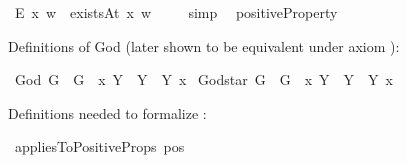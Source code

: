 \begin{isabellebody}
\ {\isachardoublequoteopen}E{\isacharbang}\ x\ w\ {\isasymlongleftrightarrow}\ existsAt\ x\ w{\isachardoublequoteclose}\ \isanewline
%
\isadelimproof
\ \ %
\endisadelimproof
%
\isatagproof
{}\isamarkupfalse%
\ simp\ %
%
\endisatagproof
{\isafoldproof}%
%
\isadelimproof
\isanewline
%
\endisadelimproof
\isanewline
{}\isamarkupfalse%
\ positiveProperty{\isacharcolon}{\isacharcolon}{\isachardoublequoteopen}{\isasymup}{\isasymlangle}{\isasymup}{\isasymlangle}{\isasymzero}{\isasymrangle}{\isasymrangle}{\isachardoublequoteclose}\ {\isacharparenleft}{\isachardoublequoteopen}{\isasymP}{\isachardoublequoteclose}{\isacharparenright}\ %
%
\begin{isamarkuptext}%
Definitions of God (later shown to be equivalent under axiom ):%
\end{isamarkuptext}\isamarkuptrue%
\isamarkupfalse%
\ God{\isacharcolon}{\isacharcolon}{\isachardoublequoteopen}{\isasymup}{\isasymlangle}{\isasymzero}{\isasymrangle}{\isachardoublequoteclose}\ {\isacharparenleft}{\isachardoublequoteopen}G{\isachardoublequoteclose}{\isacharparenright}\ \ {\isachardoublequoteopen}G\ {\isasymequiv}\ {\isacharparenleft}{\isasymlambda}x{\isachardot}\ \isactrlbold {\isasymforall}Y{\isachardot}\ {\isasymP}\ Y\ \isactrlbold {\isasymrightarrow}\ Y\ x{\isacharparenright}{\isachardoublequoteclose}\isanewline
{}\isamarkupfalse%
\ God{\isacharunderscore}star{\isacharcolon}{\isacharcolon}{\isachardoublequoteopen}{\isasymup}{\isasymlangle}{\isasymzero}{\isasymrangle}{\isachardoublequoteclose}\ {\isacharparenleft}{\isachardoublequoteopen}G{\isacharasterisk}{\isachardoublequoteclose}{\isacharparenright}\ \ {\isachardoublequoteopen}G{\isacharasterisk}\ {\isasymequiv}\ {\isacharparenleft}{\isasymlambda}x{\isachardot}\ \isactrlbold {\isasymforall}Y{\isachardot}\ {\isasymP}\ Y\ \isactrlbold {\isasymleftrightarrow}\ Y\ x{\isacharparenright}{\isachardoublequoteclose}%
\begin{isamarkuptext}%
Definitions needed to formalize :%
\end{isamarkuptext}\isamarkuptrue%
\isamarkupfalse%
\ appliesToPositiveProps{\isacharcolon}{\isacharcolon}{\isachardoublequoteopen}{\isasymup}{\isasymlangle}{\isasymup}{\isasymlangle}{\isasymup}{\isasymlangle}{\isasymzero}{\isasymrangle}{\isasymrangle}{\isasymrangle}{\isachardoublequoteclose}\ {\isacharparenleft}{\isachardoublequoteopen}pos{\isachardoublequoteclose}{\isacharparenright}\ \isanewline

\end{isabellebody}
